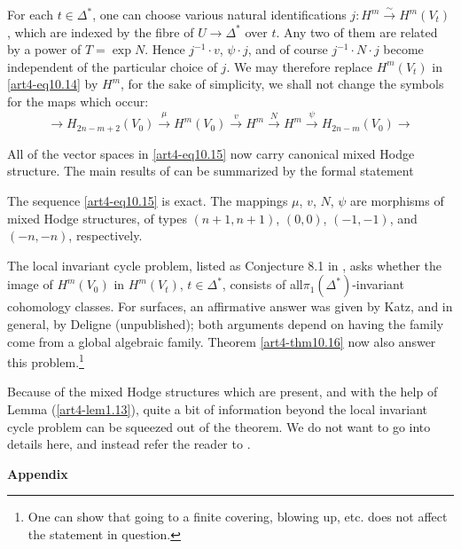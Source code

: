 For each $t \in \Delta^\ast$, one can choose various natural identifications $j: H^m \xrightarrow{\sim} H^m (V_t)$, which are indexed by the fibre of $U \to \Delta^\ast$ over $t$. Any two of them are related by a power of $T = \exp N$. Hence $j^{-1} \cdot v$, $\psi \cdot j$, and of course $j^{-1} \cdot N \cdot j$ become independent of the particular choice of $j$. We may therefore replace $H^m (V_t)$ in \eqref{art4-eq10.14} by $H^m$, for the sake of simplicity, we shall not change the symbols for the maps which occur:
\begin{equation}
\longrightarrow H_{2n - m + 2} (V_0) \xrightarrow{\mu} H^m (V_0) \xrightarrow{v} H^m \xrightarrow{N} H^m \xrightarrow{\psi} H_{2n-m} (V_0) \longrightarrow
\label{art4-eq10.15}
\end{equation}

All of the vector spaces in \eqref{art4-eq10.15} now carry canonical mixed Hodge structure. The main results of \cite{art4-key10} can be summarized by the formal statement

\begin{theorem}\label{art4-thm10.16}
The sequence \eqref{art4-eq10.15} is exact. The mappings $\mu$, $v$, $N$, $\psi$ are morphisms of mixed Hodge structures, of types $(n+1, n+1)$, $(0,0)$, $(-1, -1)$, and $(-n, -n)$, respectively.
\end{theorem}

The local invariant cycle problem, listed as Conjecture 8.1 in \cite{art4-key21}, asks whether the image of $H^m (V_0)$ in $H^m (V_t)$, $t \in \Delta^\ast$, consists of all\pageoriginale $\pi_1 (\Delta^\ast)$-invariant cohomology classes. For surfaces, an affirmative answer was given by Katz, and in general, by Deligne (unpublished); both arguments depend on having the family come from a global algebraic family. Theorem \eqref{art4-thm10.16} now also answer this problem.\footnote[44]{One can show that going to a finite covering, blowing up, etc. does not affect the statement in question.}

Because of the mixed Hodge structures which are present, and with the help of Lemma (\ref{art4-lem1.13}), quite a bit of information beyond the local invariant cycle problem can be squeezed out of the theorem. We do not want to go into details here, and instead refer the reader to \cite{art4-key10}.

\bigskip
\begin{center}
\textbf{Appendix}
\end{center}

